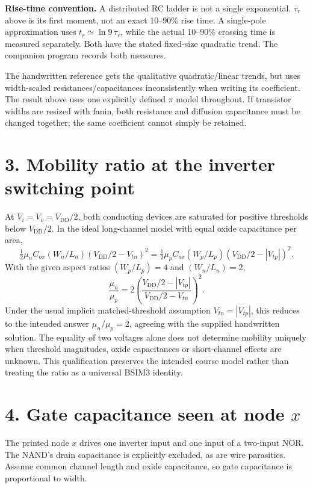 \documentclass[11pt,a4paper]{article}
\newcommand{\VDD}{V_{\mathrm{DD}}}
\begin{document}
\textbf{Rise-time convention.} A distributed RC ladder is not a single
exponential. $\tau_r$ above is its first moment, not an exact 10--90\% rise
time. A single-pole approximation uses $t_r\simeq\ln9\,\tau_r$, while the
actual 10--90\% crossing time is measured separately. Both have the stated
fixed-size quadratic trend. The companion program records both measures.

The handwritten reference gets the qualitative quadratic/linear trends,
but uses width-scaled resistances/capacitances inconsistently when writing
its coefficient. The result above uses one explicitly defined $\pi$ model
throughout. If transistor widths are resized with fanin, both resistance
and diffusion capacitance must be changed together; the same coefficient
cannot simply be retained.

\section*{3. Mobility ratio at the inverter switching point}
At $V_i=V_o=\VDD/2$, both conducting devices are saturated for positive
thresholds below $\VDD/2$. In the ideal long-channel model with equal oxide
capacitance per area,
\[
 \tfrac12\mu_n C_{ox}(W_n/L_n)(\VDD/2-V_{tn})^2
 =\tfrac12\mu_p C_{ox}(W_p/L_p)(\VDD/2-|V_{tp}|)^2.
\]
With the given aspect ratios $(W_p/L_p)=4$ and $(W_n/L_n)=2$,
\[
 \boxed{\frac{\mu_n}{\mu_p}
 =2\left(\frac{\VDD/2-|V_{tp}|}{\VDD/2-V_{tn}}\right)^2.}
\]
Under the usual implicit matched-threshold assumption
$V_{tn}=|V_{tp}|$, this reduces to the intended answer
$\boxed{\mu_n/\mu_p=2}$, agreeing with the supplied handwritten solution.
The equality of two voltages alone does not determine mobility uniquely
when threshold magnitudes, oxide capacitances or short-channel effects are
unknown. This qualification preserves the intended course model rather
than treating the ratio as a universal BSIM3 identity.

\section*{4. Gate capacitance seen at node $x$}
The printed node $x$ drives one inverter input and one input of a two-input
NOR. The NAND's drain capacitance is explicitly excluded, as are wire
parasitics. Assume common channel length and oxide capacitance, so gate
capacitance is proportional to width.
\end{document}
